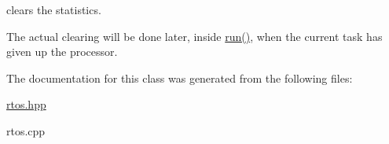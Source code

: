 clears the statistics. 

The actual clearing will be done later, inside \hyperlink{classrtos_a68de598a7ba3231db123f26187b31730}{run()}, when the current task has given up the processor. 

The documentation for this class was generated from the following files\+:\begin{DoxyCompactItemize}
\item 
\hyperlink{rtos_8hpp}{rtos.\+hpp}\item 
rtos.\+cpp\end{DoxyCompactItemize}
